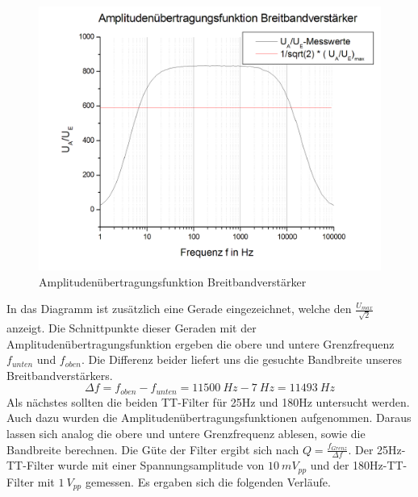 \documentclass{scrartcl}						%
\begin{document}
			\begin{figure}[h!]
				\centering
				\includegraphics[scale=0.4]{A1a}
				\caption{Amplitudenübertragungsfunktion Breitbandverstärker}
			\end{figure}
			In das Diagramm ist zusätzlich eine Gerade eingezeichnet, welche den $ \frac{U_{max}}{\sqrt{2}} $ anzeigt. Die Schnittpunkte dieser Geraden mit der Amplitudenübertragungsfunktion ergeben die obere und untere Grenzfrequenz $ f_{unten} $ und $ f_{oben} $. Die Differenz beider liefert uns die gesuchte Bandbreite unseres Breitbandverstärkers.
			\begin{equation*}
				\Delta f=f_{oben}-f_{unten}=11500 \ Hz - 7 \ Hz = 11493 \ Hz
			\end{equation*}
			\newline
			Als nächstes sollten die beiden TT-Filter für 25Hz und 180Hz untersucht werden. Auch dazu wurden die Amplitudenübertragungsfunktionen aufgenommen. Daraus lassen sich analog die obere und untere Grenzfrequenz ablesen, sowie die Bandbreite berechnen. Die Güte der Filter ergibt sich nach $ Q=\frac{f_{Grenz}}{\Delta f} $. Der 25Hz-TT-Filter wurde mit einer Spannungsamplitude von $10 \ mV_{pp}$ und der 180Hz-TT-Filter mit $1\ V_{pp}$ gemessen. Es ergaben sich die folgenden Verläufe.
			\clearpage
\end{document}
